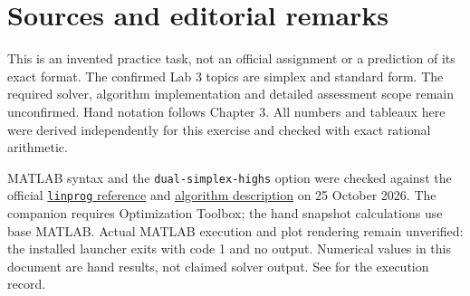 \documentclass[11pt,a4paper]{article}
\begin{document}
\section{Sources and editorial remarks}
This is an invented practice task, not an official assignment or a prediction
of its exact format. The confirmed Lab 3 topics are simplex and
standard form. The required solver, algorithm implementation and detailed assessment
scope remain unconfirmed.
Hand notation follows Chapter 3. All numbers and tableaux here were derived
independently for this exercise and checked with exact rational arithmetic.

MATLAB syntax and the \texttt{dual-simplex-highs} option were checked against
the official \href{https://www.mathworks.com/help/optim/ug/linprog.html}{\texttt{linprog} reference}
and \href{https://www.mathworks.com/help/optim/ug/linear-programming-algorithms.html}{algorithm description}
on 25 October 2026. The companion requires Optimization Toolbox; the hand
snapshot calculations use base MATLAB. Actual MATLAB execution and plot
rendering remain unverified: the installed launcher exits with code 1 and no
output. Numerical values in this document are hand results, not claimed solver
output. See  for the execution record.
\end{document}

